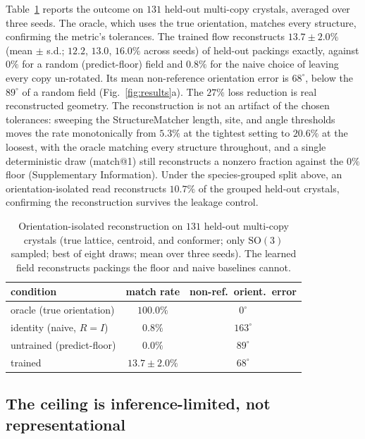 \documentclass[11pt]{article}
\begin{document}
Table~\ref{tab:matchrate} reports the outcome on $131$ held-out multi-copy
crystals, averaged over three seeds. The oracle, which uses the true orientation,
matches every structure, confirming the metric's tolerances. The trained flow
reconstructs $13.7\pm2.0\%$ (mean $\pm$ s.d.; $12.2$, $13.0$, $16.0\%$ across
seeds) of held-out packings exactly, against $0\%$ for a random (predict-floor)
field and $0.8\%$ for the naive choice of leaving every copy un-rotated. Its mean
non-reference orientation error is $68^\circ$, below the $89^\circ$ of a random
field (Fig.~\ref{fig:results}a). The $27\%$ loss reduction is real reconstructed
geometry. The reconstruction is not an artifact of the chosen tolerances:
sweeping the StructureMatcher length, site, and angle thresholds moves the rate
monotonically from $5.3\%$ at the tightest setting to $20.6\%$ at the loosest,
with the oracle matching every structure throughout, and a single deterministic
draw (match@1) still reconstructs a nonzero fraction against the $0\%$ floor
(Supplementary Information). Under the species-grouped split above, an
orientation-isolated read reconstructs $10.7\%$ of the grouped held-out crystals,
confirming the reconstruction survives the leakage control.

\begin{table}[t]
\centering
\caption{Orientation-isolated reconstruction on $131$ held-out multi-copy
crystals (true lattice, centroid, and conformer; only $\mathrm{SO}(3)$ sampled;
best of eight draws; mean over three seeds). The learned field reconstructs
packings the floor and naive baselines cannot.}
\label{tab:matchrate}
\begin{tabular}{lcc}
\toprule
condition & match rate & non-ref.\ orient.\ error \\
\midrule
oracle (true orientation) & $100.0\%$ & $0^\circ$ \\
identity (naive, $R=I$)   & $0.8\%$   & $163^\circ$ \\
untrained (predict-floor) & $0.0\%$   & $89^\circ$ \\
trained                   & $13.7\pm2.0\%$  & $68^\circ$ \\
\bottomrule
\end{tabular}
\end{table}

\subsection{The ceiling is inference-limited, not representational}
\end{document}
